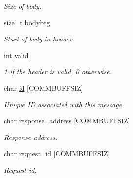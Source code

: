 \begin{DoxyCompactItemize}
\begin{DoxyCompactList}\small\item\em Size of body. \end{DoxyCompactList}\item 
\mbox{\label{structcomm__head__t_a5e01ad7e302f5597bccfcf208cdcbe0a}} 
size\+\_\+t \mbox{\hyperlink{structcomm__head__t_a5e01ad7e302f5597bccfcf208cdcbe0a}{bodybeg}}
\begin{DoxyCompactList}\small\item\em Start of body in header. \end{DoxyCompactList}\item 
\mbox{\label{structcomm__head__t_a541f991a66b2422bec7b1cc25b5dd567}} 
int \mbox{\hyperlink{structcomm__head__t_a541f991a66b2422bec7b1cc25b5dd567}{valid}}
\begin{DoxyCompactList}\small\item\em 1 if the header is valid, 0 otherwise. \end{DoxyCompactList}\item 
\mbox{\label{structcomm__head__t_ade03bb53d07aaffff906db9a8d95da02}} 
char \mbox{\hyperlink{structcomm__head__t_ade03bb53d07aaffff906db9a8d95da02}{id}} \mbox{[}C\+O\+M\+M\+B\+U\+F\+F\+S\+IZ\mbox{]}
\begin{DoxyCompactList}\small\item\em Unique ID associated with this message. \end{DoxyCompactList}\item 
\mbox{\label{structcomm__head__t_a5a1970e9fb2c1087c001345603ab5c2b}} 
char \mbox{\hyperlink{structcomm__head__t_a5a1970e9fb2c1087c001345603ab5c2b}{response\+\_\+address}} \mbox{[}C\+O\+M\+M\+B\+U\+F\+F\+S\+IZ\mbox{]}
\begin{DoxyCompactList}\small\item\em Response address. \end{DoxyCompactList}\item 
\mbox{\label{structcomm__head__t_a80b9979899d06f21b7f996c1a119e665}} 
char \mbox{\hyperlink{structcomm__head__t_a80b9979899d06f21b7f996c1a119e665}{request\+\_\+id}} \mbox{[}C\+O\+M\+M\+B\+U\+F\+F\+S\+IZ\mbox{]}
\begin{DoxyCompactList}\small\item\em Request id. \end{DoxyCompactList}\item 

\end{DoxyCompactItemize}
